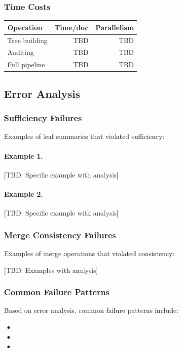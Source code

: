 \subsubsection{Time Costs}

\begin{center}
\begin{tabular}{lrr}
\toprule
Operation & Time/doc & Parallelism \\
\midrule
Tree building & TBD & TBD \\
Auditing & TBD & TBD \\
Full pipeline & TBD & TBD \\
\bottomrule
\end{tabular}
\end{center}

\subsection{Error Analysis}

\subsubsection{Sufficiency Failures}

Examples of leaf summaries that violated sufficiency:

\paragraph{Example 1.}
[TBD: Specific example with analysis]

\paragraph{Example 2.}
[TBD: Specific example with analysis]

\subsubsection{Merge Consistency Failures}

Examples of merge operations that violated consistency:

[TBD: Examples with analysis]

\subsubsection{Common Failure Patterns}

Based on error analysis, common failure patterns include:
\begin{itemize}[nosep]
    \item [TBD: Pattern 1]
    \item [TBD: Pattern 2]
    \item [TBD: Pattern 3]
\end{itemize}

